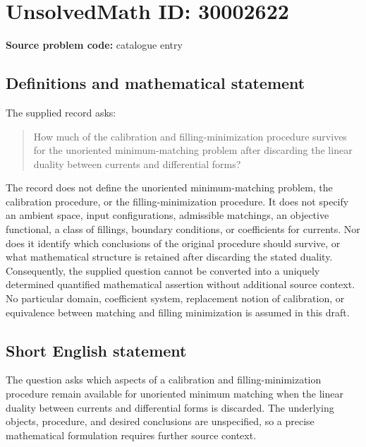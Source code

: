 \documentclass[11pt]{article}
\begin{document}
\section*{UnsolvedMath ID: 30002622}
\textbf{Source problem code:} catalogue entry
\subsection{Definitions and mathematical statement}
The supplied record asks:
\begin{quote}
How much of the calibration and filling-minimization procedure survives for the unoriented minimum-matching problem after discarding the linear duality between currents and differential forms?
\end{quote}
The record does not define the unoriented minimum-matching problem, the calibration procedure, or the filling-minimization procedure. It does not specify an ambient space, input configurations, admissible matchings, an objective functional, a class of fillings, boundary conditions, or coefficients for currents. Nor does it identify which conclusions of the original procedure should survive, or what mathematical structure is retained after discarding the stated duality. Consequently, the supplied question cannot be converted into a uniquely determined quantified mathematical assertion without additional source context. No particular domain, coefficient system, replacement notion of calibration, or equivalence between matching and filling minimization is assumed in this draft.
\subsection{Short English statement}
The question asks which aspects of a calibration and filling-minimization procedure remain available for unoriented minimum matching when the linear duality between currents and differential forms is discarded. The underlying objects, procedure, and desired conclusions are unspecified, so a precise mathematical formulation requires further source context.
\end{document}

